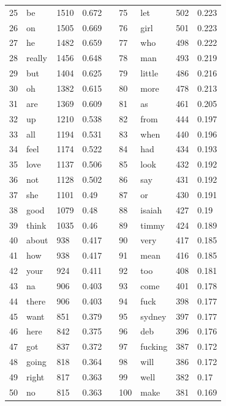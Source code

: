 \documentclass[11pt]{article}
\begin{document}
\begin{longtable}{lllllllll}
25 & be & 1510 & 0.672 &  & 75 & let & 502 & 0.223 \\
26 & on & 1505 & 0.669 &  & 76 & girl & 501 & 0.223 \\
27 & he & 1482 & 0.659 &  & 77 & who & 498 & 0.222 \\
28 & really & 1456 & 0.648 &  & 78 & man & 493 & 0.219 \\
29 & but & 1404 & 0.625 &  & 79 & little & 486 & 0.216 \\
30 & oh & 1382 & 0.615 &  & 80 & more & 478 & 0.213 \\
31 & are & 1369 & 0.609 &  & 81 & as & 461 & 0.205 \\
32 & up & 1210 & 0.538 &  & 82 & from & 444 & 0.197 \\
33 & all & 1194 & 0.531 &  & 83 & when & 440 & 0.196 \\
34 & feel & 1174 & 0.522 &  & 84 & had & 434 & 0.193 \\
35 & love & 1137 & 0.506 &  & 85 & look & 432 & 0.192 \\
36 & not & 1128 & 0.502 &  & 86 & say & 431 & 0.192 \\
37 & she & 1101 & 0.49 &  & 87 & or & 430 & 0.191 \\
38 & good & 1079 & 0.48 &  & 88 & isaiah & 427 & 0.19 \\
39 & think & 1035 & 0.46 &  & 89 & timmy & 424 & 0.189 \\
40 & about & 938 & 0.417 &  & 90 & very & 417 & 0.185 \\
41 & how & 938 & 0.417 &  & 91 & mean & 416 & 0.185 \\
42 & your & 924 & 0.411 &  & 92 & too & 408 & 0.181 \\
43 & na & 906 & 0.403 &  & 93 & come & 401 & 0.178 \\
44 & there & 906 & 0.403 &  & 94 & fuck & 398 & 0.177 \\
45 & want & 851 & 0.379 &  & 95 & sydney & 397 & 0.177 \\
46 & here & 842 & 0.375 &  & 96 & deb & 396 & 0.176 \\
47 & got & 837 & 0.372 &  & 97 & fucking & 387 & 0.172 \\
48 & going & 818 & 0.364 &  & 98 & will & 386 & 0.172 \\
49 & right & 817 & 0.363 &  & 99 & well & 382 & 0.17 \\
50 & no & 815 & 0.363 &  & 100 & make & 381 & 0.169 \\
\end{longtable}
\normalsize\setlength{\tabcolsep}{6pt}
\end{document}
